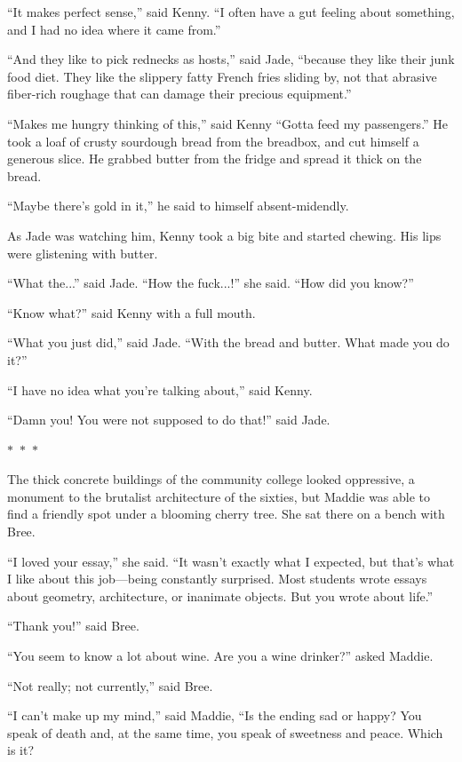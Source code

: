 \documentclass{memoir}
\newcommand{\starbreak}{%
\begin{center}
  $\ast$~$\ast$~$\ast$
\end{center}
}
\begin{document}
``It makes perfect sense,'' said Kenny. ``I often have a gut feeling about something, and I had no idea where it came from.'' 

``And they like to pick rednecks as hosts,'' said Jade, ``because they like their junk food diet. They like the slippery fatty French fries sliding by, not that abrasive fiber-rich roughage that can damage their precious equipment.''

``Makes me hungry thinking of this,'' said Kenny ``Gotta feed my passengers.'' He took a loaf of crusty sourdough bread from the breadbox, and cut himself a generous slice. He grabbed butter from the fridge and spread it thick on the bread. 

``Maybe there's gold in it,'' he said to himself absent-midendly.

As Jade was watching him, Kenny took a big bite and started chewing. His lips were glistening with butter.

``What the...'' said Jade. ``How the fuck...!'' she said. ``How did you know?''

``Know what?'' said Kenny with a full mouth.

``What you just did,'' said Jade. ``With the bread and butter. What made you do it?''

``I have no idea what you're talking about,'' said Kenny.

``Damn you! You were not supposed to do that!'' said Jade.

\starbreak

The thick concrete buildings of the community college looked oppressive, a monument to the brutalist architecture of the sixties, but Maddie was able to find a friendly spot under a blooming cherry tree. She sat there on a bench with Bree. 

``I loved your essay,'' she said. ``It wasn't exactly what I expected, but that's what I like about this job---being constantly surprised. Most students wrote essays about geometry, architecture, or inanimate objects. But you wrote about life.''

``Thank you!'' said Bree.

``You seem to know a lot about wine. Are you a wine drinker?'' asked Maddie.

``Not really; not currently,'' said Bree.

``I can't make up my mind,'' said Maddie, ``Is the ending sad or happy? You speak of death and, at the same time, you speak of sweetness and peace. Which is it? 
\end{document}
